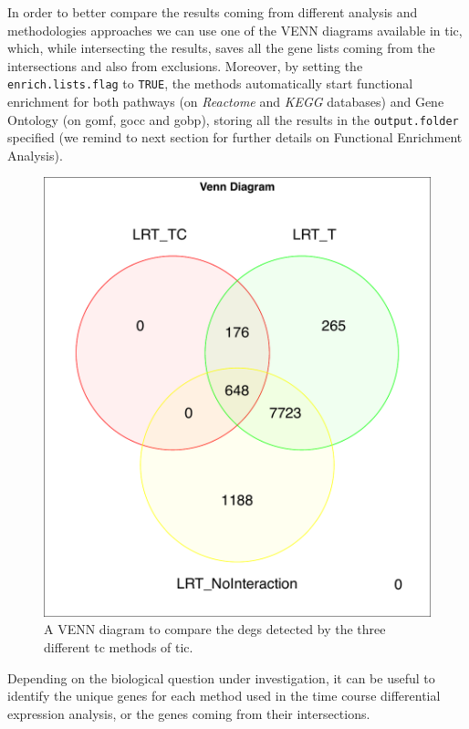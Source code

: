 In order to better compare the results coming from different analysis and methodologies approaches we can use one of the VENN diagrams available in \gls{tic}, which, while intersecting the results, saves all the gene lists coming from the intersections and also from exclusions.
Moreover, by setting the \lstinline!enrich.lists.flag! to \lstinline!TRUE!, the methods automatically start functional enrichment for both pathways (on \textit{Reactome} and \textit{KEGG} databases) and Gene Ontology (on \gls{gomf}, \gls{gocc} and \gls{gobp}), storing all the results in the \lstinline!output.folder! specified (we remind to next section for further details on Functional Enrichment Analysis).

\begin{figure}[H]
\includegraphics[width=\textwidth,height=\textheight,keepaspectratio]{img/ticorser/de/venn3.pdf}
\caption[ticorser venn diagram]{A VENN diagram to compare the \glspl{deg} detected by the three different \gls{tc} methods of \gls{tic}.}
\label{fig:ticorservenn}
\centering
\end{figure}

Depending on the biological question under investigation, it can be useful to identify the unique genes for each method used in the time course differential expression analysis, or the genes coming from their intersections.

